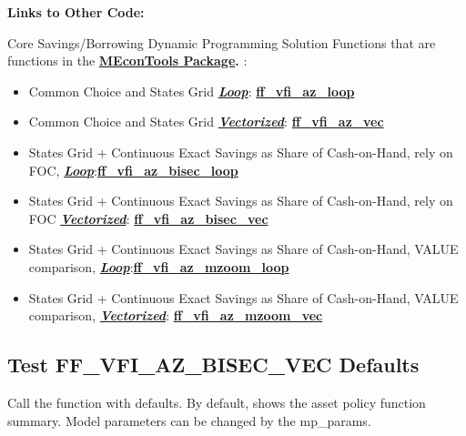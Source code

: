 \documentclass[
]{book}
\begin{document}
\textbf{Links to Other Code:}

Core Savings/Borrowing Dynamic Programming Solution Functions that are
functions in the \href{https://fanwangecon.github.io/MEconTools/}{\textbf{MEconTools
Package}}\textbf{.} :

\begin{itemize}
\item
  Common Choice and States Grid \underline{\textbf{\emph{Loop}}}:
  \href{https://github.com/FanWangEcon/MEconTools/blob/master/MEconTools/vfi/ff_vfi_az_loop.m}{\textbf{ff\_vfi\_az\_loop}}
\item
  Common Choice and States Grid \underline{\textbf{\emph{Vectorized}}}:
  \href{https://github.com/FanWangEcon/MEconTools/blob/master/MEconTools/vfi/ff_vfi_az_vec.m}{\textbf{ff\_vfi\_az\_vec}}
\item
  States Grid + Continuous Exact Savings as Share of Cash-on-Hand,
  rely on FOC, \underline{\textbf{\emph{Loop}}}:\href{https://github.com/FanWangEcon/MEconTools/blob/master/MEconTools/vfi/ff_vfi_az_bisec_loop.m}{\textbf{ff\_vfi\_az\_bisec\_loop}}
\item
  States Grid + Continuous Exact Savings as Share of Cash-on-Hand,
  rely on FOC \underline{\textbf{\emph{Vectorized}}}:
  \href{https://github.com/FanWangEcon/MEconTools/blob/master/MEconTools/vfi/ff_vfi_az_bisec_vec.m}{\textbf{ff\_vfi\_az\_bisec\_vec}}
\item
  States Grid + Continuous Exact Savings as Share of Cash-on-Hand,
  VALUE comparison, \underline{\textbf{\emph{Loop}}}:\href{https://github.com/FanWangEcon/MEconTools/blob/master/MEconTools/vfi/ff_vfi_az_mzoom_loop.m}{\textbf{ff\_vfi\_az\_mzoom\_loop}}
\item
  States Grid + Continuous Exact Savings as Share of Cash-on-Hand,
  VALUE comparison, \underline{\textbf{\emph{Vectorized}}}:
  \href{https://github.com/FanWangEcon/MEconTools/blob/master/MEconTools/vfi/ff_vfi_az_mzoom_vec.m}{\textbf{ff\_vfi\_az\_mzoom\_vec}}
\end{itemize}

\hypertarget{test-ff_vfi_az_bisec_vec-defaults}{%
\subsection{Test FF\_VFI\_AZ\_BISEC\_VEC Defaults}\label{test-ff_vfi_az_bisec_vec-defaults}}

Call the function with defaults. By default, shows the asset policy
function summary. Model parameters can be changed by the mp\_params.
\end{document}
